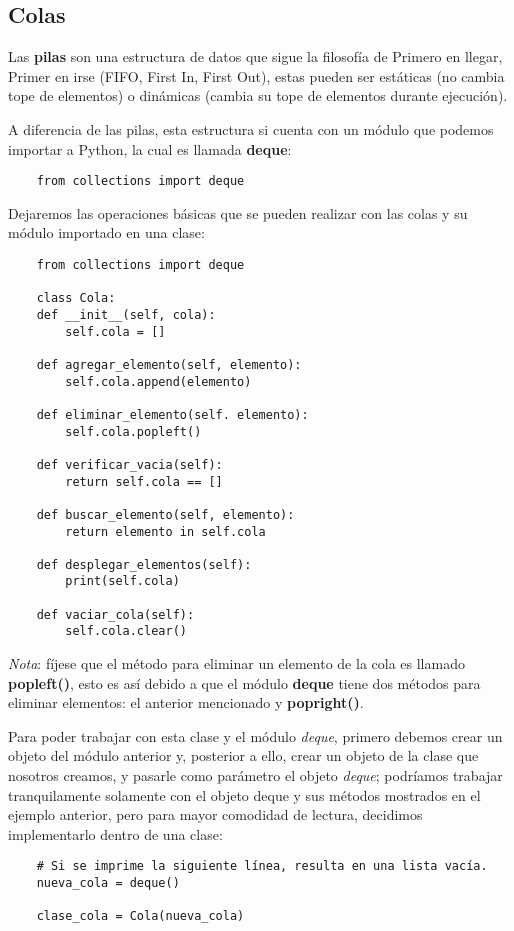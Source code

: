 \subsection{Colas}

Las \textbf{pilas} son una estructura de datos que sigue la filosofía de Primero en llegar, Primer en irse (FIFO, First In, First Out), estas pueden ser estáticas (no cambia tope de elementos) o dinámicas (cambia su tope de elementos durante ejecución).

A diferencia de las pilas, esta estructura si cuenta con un módulo que podemos importar a Python, la cual es llamada \textbf{deque}:
\begin{lstlisting}
    from collections import deque
\end{lstlisting}

Dejaremos las operaciones básicas que se pueden realizar con las colas y su módulo importado en una clase:
\begin{lstlisting}
    from collections import deque

    class Cola:
	def __init__(self, cola):
		self.cola = []

	def agregar_elemento(self, elemento):
		self.cola.append(elemento)

	def eliminar_elemento(self. elemento):
		self.cola.popleft()

	def verificar_vacia(self):
		return self.cola == []

	def buscar_elemento(self, elemento):
		return elemento in self.cola

	def desplegar_elementos(self):
		print(self.cola)

	def vaciar_cola(self):
		self.cola.clear()
\end{lstlisting}

\textit{Nota}: fíjese que el método para eliminar un elemento de la cola es llamado \textbf{popleft()}, esto es así debido a que el módulo \textbf{deque} tiene dos métodos para eliminar elementos: el anterior mencionado y \textbf{popright()}.

Para poder trabajar con esta clase y el módulo \textit{deque}, primero debemos crear un objeto del módulo anterior y, posterior a ello, crear un objeto de la clase que nosotros creamos, y pasarle como parámetro el objeto \textit{deque}; podríamos trabajar tranquilamente solamente con el objeto deque y sus métodos mostrados en el ejemplo anterior, pero para mayor comodidad de lectura, decidimos implementarlo dentro de una clase:
\begin{lstlisting}
    # Si se imprime la siguiente línea, resulta en una lista vacía.
    nueva_cola = deque()

    clase_cola = Cola(nueva_cola)
\end{lstlisting}


